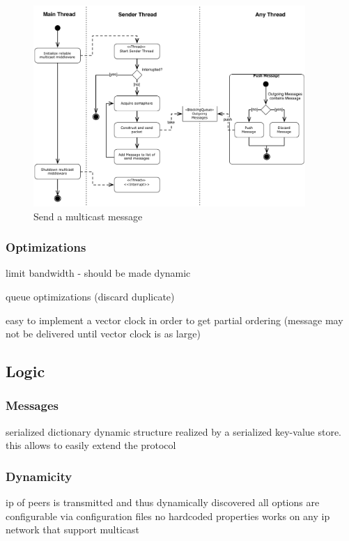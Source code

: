 \begin{figure}[htbp]
    \centering
        \includegraphics[height=3in]{figures/sendMessage.pdf}
    \caption{Send a multicast message}
    \label{fig:figures_processMessages}
\end{figure}

\subsubsection{Optimizations}

limit bandwidth 
    - should be made dynamic
    
    
queue optimizations (discard duplicate)

easy to implement a vector clock in order to get partial ordering  (message may not be delivered until vector clock is as large)



\subsection{Logic}

    
    \subsubsection{Messages}
    serialized dictionary
    dynamic structure realized by a serialized key-value store. 
    this allows to easily extend the protocol

    \subsubsection{Dynamicity}
    ip of peers is transmitted and thus dynamically discovered
    all options are configurable via configuration files
    no hardcoded properties
    works on any ip network that support multicast
    
